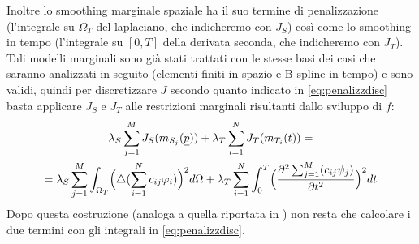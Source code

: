 \documentclass[a4paper,11pt,twoside,openright]{book}							%
\begin{document}
Inoltre lo smoothing marginale spaziale ha il suo termine di penalizzazione (l'integrale su $\Omega_T$ del laplaciano, che indicheremo con $J_S$) così come lo smoothing in tempo (l'integrale su $[0,T]$ della derivata seconda, che indicheremo con $J_T$). Tali modelli marginali sono già stati trattati con le stesse basi dei casi che saranno analizzati in seguito (elementi finiti in spazio e B-spline in tempo) e sono validi, quindi per discretizzare $J$ secondo quanto indicato in \ref{eq:penalizzdisc} basta applicare $J_S$ e $J_T$ alle restrizioni marginali risultanti dallo sviluppo di $f$:
\begin{multline*}
\lambda_S  \sum_{j=1}^M J_S(m_{S_j}(\underline p)) +
\lambda_T \sum_{i=1}^N J_T(m_{T_i}(t)) =\\
=\lambda_S  \sum_{j=1}^M \int_{\Omega_T} \Bigl( \triangle(\sum_{i=1}^N  c_{ij}\varphi_i ) \Bigr)^2 d \Omega + \lambda_T \sum_{i=1}^N\int_0^T \Bigl( \frac{\partial^2 \sum_{j=1}^M(c_{ij}\psi_j) }{\partial t ^2} \Bigr)^2 dt
\end{multline*}
Dopo questa costruzione (analoga a quella riportata in \cite{art:marra}) non resta che calcolare i due termini con gli integrali in \ref{eq:penalizzdisc}.
\end{document}
